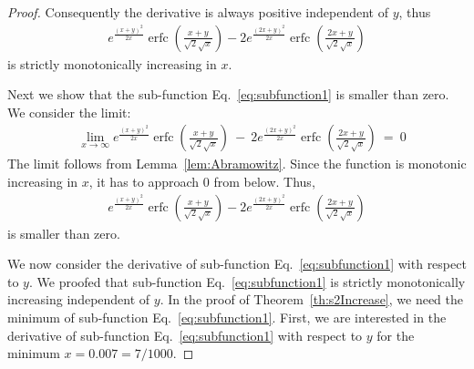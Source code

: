 \documentclass{article}
\DeclareMathOperator{\erfc}{erfc}
\begin{document}
\begin{proof}
Consequently the derivative is always positive independent of $y$,
thus 
\begin{align}
e^{\frac{(x+y)^2}{2 x}} \erfc \left(\frac{x+y}{\sqrt{2} \sqrt{x}}\right)-2 e^{\frac{(2 x+y)^2}{2 x}} \erfc \left(\frac{2 x+y}{\sqrt{2} \sqrt{x}}\right)
\end{align}
is strictly monotonically increasing in $x$.



Next we show that the 
sub-function Eq.~\eqref{eq:subfunction1} is smaller
than zero.
We consider the limit:
\begin{align}
&\lim_{x \to \infty}e^{\frac{(x+y)^2}{2 x}}
  \erfc \left(\frac{x+y}{\sqrt{2} \sqrt{x}}\right) \ - \ 2 e^{\frac{(2 x+y)^2}{2 x}} \erfc \left(\frac{2 x+y}{\sqrt{2} \sqrt{x}}\right)
\ = \ 0
\end{align}
The limit follows from Lemma~\ref{lem:Abramowitz}.
Since the function is monotonic increasing in $x$, it has to approach
$0$ from below. Thus,
\begin{align}
e^{\frac{(x+y)^2}{2 x}} \erfc \left(\frac{x+y}{\sqrt{2} \sqrt{x}}\right)-2 e^{\frac{(2 x+y)^2}{2 x}} \erfc \left(\frac{2 x+y}{\sqrt{2} \sqrt{x}}\right)
\end{align}
is smaller than zero.


We now consider the derivative of sub-function
Eq.~\eqref{eq:subfunction1} with respect to $y$.
We proofed that sub-function
Eq.~\eqref{eq:subfunction1} is  strictly monotonically increasing 
independent of $y$. 
In the proof of Theorem~\ref{th:s2Increase}, we need the minimum
of  sub-function
Eq.~\eqref{eq:subfunction1}. First, we are interested in the
derivative of sub-function
Eq.~\eqref{eq:subfunction1} with respect to $y$
for the minimum $x=0.007=7/1000$.


\end{proof}
\end{document}
